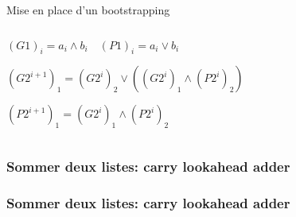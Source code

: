 \documentclass[10pt,xcolor={usenames,dvipsnames}]{beamer}
\begin{document}
\begin{section}{Mise en place d'un bootstrapping}
\begin{frame}
\begin{columns}
\begin{column}{0.6\textwidth}  %
\pause


$(G1)_i = a_i \wedge b_i \quad (P1)_i = a_i \vee b_i$
\pause

  \begin{figure}
    \begin{center}
      \begin{tikzpicture}[scale = 0.9, transform shape]
      	
      \end{tikzpicture}
    \end{center}
  \end{figure}

${(G2^{i+1})}_1 = {(G2^i)}_2 \vee \left ( {(G2^i)}_1 \wedge {(P2^i)}_2 \right)$\\

\vspace{0.3cm}

${(P2^{i+1})}_1 = {(G2^i)}_1 \wedge {(P2^i)}_2$

\end{column}
\end{columns}

\end{frame} 


\begin{frame} 
\frametitle{Sommer deux listes: carry lookahead adder}
  \begin{figure}
    \begin{center}
      \begin{tikzpicture}[scale = 0.7, transform shape]
      	
      \end{tikzpicture}
    \end{center}
  \end{figure}
\end{frame} 


\begin{frame} 
\frametitle{Sommer deux listes: carry lookahead adder}
  \begin{figure}
    \begin{center}
      \begin{tikzpicture}[scale = 0.7, transform shape]
      	
      \end{tikzpicture}
    \end{center}
  \end{figure}
\[\quad \]
\[\quad \]
\end{frame} 


\end{section}
\end{document}
